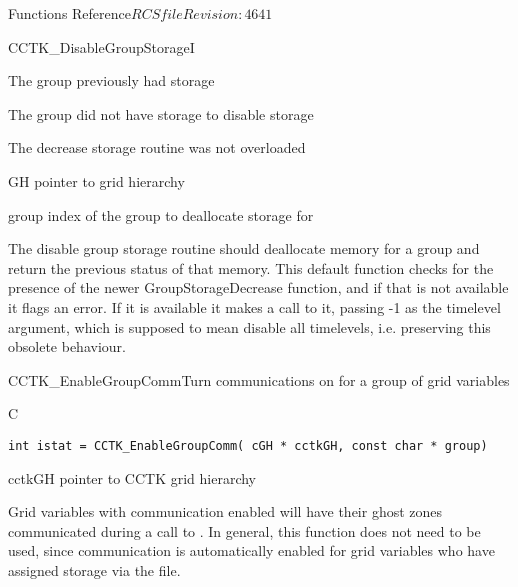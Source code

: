 \begin{cactuspart}{ Functions Reference}{$RCSfile$}{$Revision: 4641 $}
\begin{FunctionDescription}{CCTK\_DisableGroupStorageI}
\begin{ResultSection}
\begin{Result}{0}
The group previously had storage
\end{Result}
\begin{Result}{1}
The group did not have storage to disable storage
\end{Result}
\begin{Result}{-1}
The decrease storage routine was not overloaded
\end{Result}
\end{ResultSection}

\begin{ParameterSection}
\begin{Parameter}{GH}
pointer to grid hierarchy
\end{Parameter}
\begin{Parameter}{group}
index of the group to deallocate storage for
\end{Parameter}
\end{ParameterSection}

\begin{Discussion}
The disable group storage routine should deallocate memory for a group and return the previous status of that memory.
This default function checks for the presence of the newer GroupStorageDecrease function, and if that is not available it flags an error. If it is available it makes a call to it, passing -1 as the timelevel argument, which is supposed to mean disable all timelevels, i.e. preserving this obsolete behaviour.
\end{Discussion}
\end{FunctionDescription}


\begin{FunctionDescription}{CCTK\_EnableGroupComm}{Turn communications on for a group of grid variables}
\label{CCTK-EnableGroupComm}
\begin{SynopsisSection}
\begin{Synopsis}{C}
\begin{verbatim}int istat = CCTK_EnableGroupComm( cGH * cctkGH, const char * group)\end{verbatim}
\end{Synopsis}
\end{SynopsisSection}
\begin{ParameterSection}
\begin{Parameter}{cctkGH}
pointer to CCTK grid hierarchy
\end{Parameter}
\end{ParameterSection}
\begin{Discussion}
Grid variables with communication enabled will have their ghost zones communicated during a call
to . In general, this function does not need to be used, since communication
is automatically enabled for grid variables who have assigned storage via the 
file.
\end{Discussion}
\end{FunctionDescription}


\end{cactuspart}
